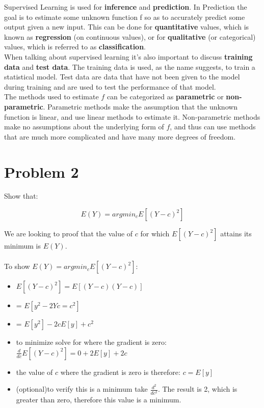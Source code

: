 \documentclass[11pt,a4paper,twoside,openright]{report}
\begin{document}
	
	\noindent Supervised Learning is used for \textbf{inference} and \textbf{prediction}. In Prediction the goal is to estimate some unknown function f so as to accurately predict some output given a new input. This can be done for \textbf{quantitative} values, which is known as \textbf{regression} (on continuous values), or for \textbf{qualitative} (or categorical) values, which is referred to as \textbf{classification}.\\
	
	
	\noindent When talking about supervised learning it's also important to discuss \textbf{training data} and \textbf{test data}. The training data is used, as the name suggests, to train a statistical model. Test data are data that have not been given to the model during training and are used to test the performance of that model.\\
	
	
	\noindent The methods used to estimate $f$ can be categorized as \textbf{parametric} or \textbf{non-parametric}. Parametric methods make the assumption that the unknown function is linear, and use linear methods to estimate it. Non-parametric methods make no assumptions about the underlying form of $f$, and thus can use methods that are much more complicated and have many more degrees of freedom.\\
	
	\newpage
	\section*{Problem 2}
	
	
	Show that:
	
	\[ E(Y) = argmin_{c}E[(Y-c)^2] \]
	
	We are looking to proof that the value of $c$ for which $E[(Y-c)^2]$ attains its minimum is $E(Y)$.\\\\
	
	
	To show $E(Y) = argmin_cE[(Y-c)^2]$:
	\begin{itemize}
		\item $E[(Y-c)^2] = E[(Y-c)(Y-c)]$
		\item = $E[y^2 - 2Yc = c^2]$
		\item = $E[y^2] - 2cE[y] + c^2$	
		\item to minimize solve for where the gradient is zero: $\frac{d}{dc}E[(Y-c)^2] = 0 + 2E[y] + 2c$
		\item the value of $c$ where the gradient is zero is therefore: $c=E[y]$
		\item (optional)to verify this is a minimum take $\frac{d^2}{dc^2}$. The result is 2, which is greater than zero, therefore this value is a minimum.
	\end{itemize}
	
\end{document}
